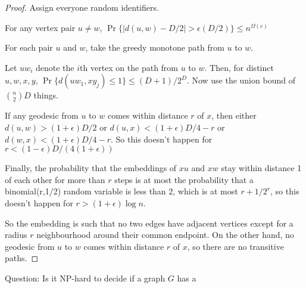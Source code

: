 \documentclass{patmorin}
\newcommand{\eps}{\epsilon}
\begin{document}
\begin{proof}
   Assign everyone random identifiers. 

   For any vertex pair $u\neq w$, $\Pr\{|d(u,w)-D/2| > \eps(D/2)\}
   \le n^{\Omega(c)}$

   For each pair $u$ and $w$, take the greedy monotone path from $u$ to $w$.

   Let $uw_i$ denote the $i$th vertex on the path from $u$ to $w$.  Then,
   for distinct $u,w,x,y$, $\Pr\{d(uw_1,xy_j)\le 1\} \le (D+1)/2^{D}$. 
   Now use the union bound of $\binom{n}{2}D$ things.

   If any geodesic from $u$ to $w$ comes within distance $r$ of $x$, then
   either $d(u,w)> (1+\eps)D/2$ or $d(u,x) < (1+\eps)D/4-r$ or $d(w,x) <
   (1+\eps)D/4-r$. So this doesn't happen for $r<(1-\eps)D/(4(1+\epsilon))$

   Finally, the probability that the embeddings of $xu$ and $xw$ stay within distance 1 of each other for more than $r$ steps is at most the probability that a binomial(r,1/2) random variable is less than $2$, which is at most $r+1/2^r$, so this doesn't happen for $r>(1+\eps)\log n$.

   So the embedding is such that no two edges have adjacent vertices
   except for a radius $r$ neighbourhood around their common endpoint. 
   On the other hand, no geodesic from $u$ to $w$ comes within distance $r$ of $x$, so there are no transitive paths. 
\end{proof}





Question: Is it NP-hard to decide if a  graph $G$ has a 



\end{document}
